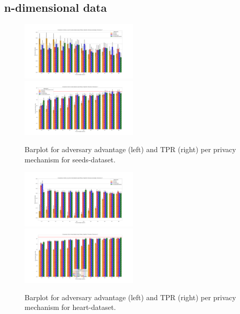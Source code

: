 \subsection{n-dimensional data}
\begin{figure}[H]
    \centering
    \begin{minipage}[c]{1.1\textwidth}
        \includegraphics[width=0.50\textwidth]{Results/RQ2-nd/seeds-dataset/shokri_mi_adv_seeds-dataset_comparison.png}
        \includegraphics[width=0.50\textwidth]{Results/RQ2-nd/seeds-dataset/tpr_seeds-dataset_comparison.png}
        \caption{Barplot for adversary advantage (left) and TPR (right) per privacy mechanism for seeds-dataset.}
        \label{fig:privacy_seeds-dataset_comparison_nd_aa_plot}
    \end{minipage}
    \begin{minipage}[c]{1.1\textwidth}
        \includegraphics[width=0.50\textwidth]{Results/RQ2-nd/heart-dataset/shokri_mi_adv_heart-dataset_comparison.png}
        \includegraphics[width=0.50\textwidth]{Results/RQ2-nd/heart-dataset/tpr_heart-dataset_comparison.png}
        \caption{Barplot for adversary advantage (left) and TPR (right) per privacy mechanism for heart-dataset.}
        \label{fig:privacy_heart-dataset_comparison_nd_aa_plot}
    \end{minipage}
\end{figure}

